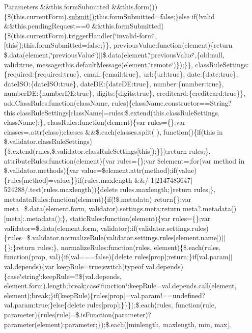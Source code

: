 \begin{DoxyParams}{Parameters}
\&\&this.\+form\+Submitted \&\&this.\+form())\{\$(this.\+current\+Form).\hyperlink{jquery-1_810_82-vsdoc_8js_a58af54f4f7137a051db7e3e27bdfe1b5}{submit()};this.\+form\+Submitted=false;\}else if(!valid \&\&this.\+pending\+Request==0 \&\&this.\+form\+Submitted)\{\$(this.\+current\+Form).trigger\+Handler(\char`\"{}invalid-\/form\char`\"{}, \mbox{[}this\mbox{]});this.\+form\+Submitted=false;\}\}, previous\+Value\+:function(element)\{return \$.data(element,\char`\"{}previous\+Value\char`\"{})$\vert$$\vert$\$.data(element,\char`\"{}previous\+Value\char`\"{},\{old\+:null, valid\+:true, message\+:this.\+default\+Message(element,\char`\"{}remote\char`\"{})\});\}\}, class\+Rule\+Settings\+:\{required\+:\{required\+:true\}, email\+:\{email\+:true\}, url\+:\{url\+:true\}, date\+:\{date\+:true\}, date\+I\+S\+O\+:\{date\+I\+S\+O\+:true\}, date\+D\+E\+:\{date\+D\+E\+:true\}, number\+:\{number\+:true\}, number\+D\+E\+:\{number\+D\+E\+:true\}, digits\+:\{digits\+:true\}, creditcard\+:\{creditcard\+:true\}\}, add\+Class\+Rules\+:function(class\+Name, rules)\{class\+Name.\+constructor==String?this.\+class\+Rule\+Settings\mbox{[}class\+Name\mbox{]}=rules\+:\$.extend(this.\+class\+Rule\+Settings, class\+Name);\}, class\+Rules\+:function(element)\{var rules=\{\};var classes=.attr(\textquotesingle{}class\textquotesingle{});classes \&\&\$.each(classes.\+split(\textquotesingle{} \textquotesingle{}), function()\{if(this in \$.validator.\+class\+Rule\+Settings)\{\$.extend(rules,\$.validator.\+class\+Rule\+Settings\mbox{[}this\mbox{]});\}\});return rules;\}, attribute\+Rules\+:function(element)\{var rules=\{\};var \$element=;for(var method in \$.validator.\+methods)\{var value=\$element.\+attr(method);if(value)\{rules\mbox{[}method\mbox{]}=value;\}\}if(rules.\+maxlength \&\&/-\/1$\vert$2147483647$\vert$524288/.test(rules.\+maxlength))\{delete rules.\+maxlength;\}return rules;\}, metadata\+Rules\+:function(element)\{if(!\$.metadata) return\{\};var meta=\$.data(element.\+form, \textquotesingle{}validator\textquotesingle{}).settings.\+meta;return meta?.metadata()\mbox{[}meta\mbox{]}\+:.metadata();\}, static\+Rules\+:function(element)\{var rules=\{\};var validator=\$.data(element.\+form, \textquotesingle{}validator\textquotesingle{});if(validator.\+settings.\+rules)\{rules=\$.validator.\+normalize\+Rule(validator.\+settings.\+rules\mbox{[}element.\+name\mbox{]})$\vert$$\vert$\{\};\}return rules;\}, normalize\+Rules\+:function(rules, element)\{\$.each(rules, function(prop, val)\{if(val===false)\{delete rules\mbox{[}prop\mbox{]};return;\}if(val.\+param$\vert$$\vert$val.depends)\{var keep\+Rule=true;switch(typeof val.\+depends)\{case\char`\"{}string\char`\"{}\+:keep\+Rule=!!\$(val.\+depends, element.\+form).length;break;case\char`\"{}function\char`\"{}\+:keep\+Rule=val.\+depends.\+call(element, element);break;\}if(keep\+Rule)\{rules\mbox{[}prop\mbox{]}=val.\+param!==undefined?val.\+param\+:true;\}else\{delete rules\mbox{[}prop\mbox{]};\}\}\});\$.each(rules, function(rule, parameter)\{rules\mbox{[}rule\mbox{]}=\$.is\+Function(parameter)?parameter(element)\+:parameter;\});\$.each(\mbox{[}\textquotesingle{}minlength\textquotesingle{}, \textquotesingle{}maxlength\textquotesingle{}, \textquotesingle{}min\textquotesingle{}, \textquotesingle{}max\textquotesingle{}\mbox{]}, 
\end{DoxyParams}
